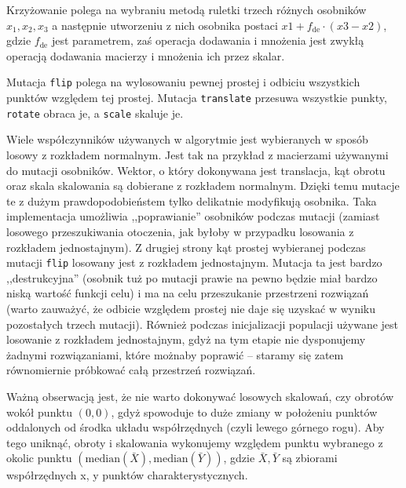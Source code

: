 \documentclass[a4paper,12pt,leqno]{article}
\newcommand{\median}{\mathrm{median}}
\begin{document}
Krzyżowanie polega na wybraniu metodą ruletki trzech różnych osobników $x_1, x_2, x_3$ a następnie utworzeniu z nich osobnika postaci
$x1 + f_\text{de}\cdot(x3-x2)$, gdzie $f_\text{de}$ jest parametrem, zaś operacja dodawania i mnożenia jest zwykłą operacją dodawania
macierzy i mnożenia ich przez skalar.

Mutacja \texttt{flip} polega na wylosowaniu pewnej prostej i odbiciu wszystkich punktów względem tej prostej. Mutacja \texttt{translate}
przesuwa wszystkie punkty, \texttt{rotate} obraca je, a \texttt{scale} skaluje je.

Wiele współczynników używanych w algorytmie jest wybieranych w sposób losowy z rozkładem normalnym. Jest tak na przykład z macierzami
używanymi do mutacji osobników. Wektor, o który dokonywana jest translacja, kąt obrotu oraz skala skalowania są dobierane z rozkładem
normalnym. Dzięki temu mutacje te z dużym prawdopodobieństem tylko delikatnie modyfikują osobnika. Taka implementacja umożliwia
,,poprawianie'' osobników podczas mutacji (zamiast losowego przeszukiwania otoczenia, jak byłoby w przypadku losowania z rozkładem
jednostajnym). Z drugiej strony kąt prostej wybieranej podczas mutacji \texttt{flip} losowany jest z rozkładem jednostajnym. Mutacja ta
jest bardzo ,,destrukcyjna'' (osobnik tuż po mutacji prawie na pewno będzie miał bardzo niską wartość funkcji celu) i ma na celu
przeszukanie przestrzeni rozwiązań (warto zauważyć, że odbicie względem prostej nie daje się uzyskać w wyniku pozostałych trzech mutacji).
Również podczas inicjalizacji populacji używane jest losowanie z rozkładem jednostajnym, gdyż na tym etapie nie dysponujemy żadnymi
rozwiązaniami, które możnaby poprawić -- staramy się zatem równomiernie próbkować całą przestrzeń rozwiązań.

Ważną obserwacją jest, że nie warto dokonywać losowych skalowań, czy obrotów wokół punktu $(0,0)$, gdyż spowoduje to duże zmiany w
położeniu punktów oddalonych od środka układu współrzędnych (czyli lewego górnego rogu). Aby tego uniknąć, obroty i skalowania wykonujemy
względem punktu wybranego z okolic punktu $(\median(\bar X), \median(\bar Y))$, gdzie $\bar X, \bar Y$ są zbiorami współrzędnych x, y
punktów charakterystycznych.
\end{document}
